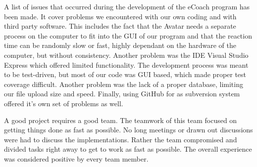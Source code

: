 A list of issues that occurred during the development of the eCoach program has been made. It cover problems we encountered with our own coding and with third party software. This includes the fact that the Avatar needs a separate process on the computer to fit into the GUI of our program and that the reaction time can be randomly slow or fast, highly dependant on the hardware of the computer, but without consistency. Another problem was the IDE Visual Studio Express which offered limited functionality. 
The development process was meant to be test-driven, but most of our code was GUI based, which made proper test coverage difficult. Another problem was the lack of a proper database, limiting our file upload size and speed. Finally, using GitHub for as subversion system offered it's own set of problems as well.

A good project requires a good team. The teamwork of this team focused on getting things done as fast as possible. No long meetings or drawn out discussions were had to discuss the implementations. Rather the team compromised and divided tasks right away to get to work as fast as possible. The overall experience was considered positive by every team member.
